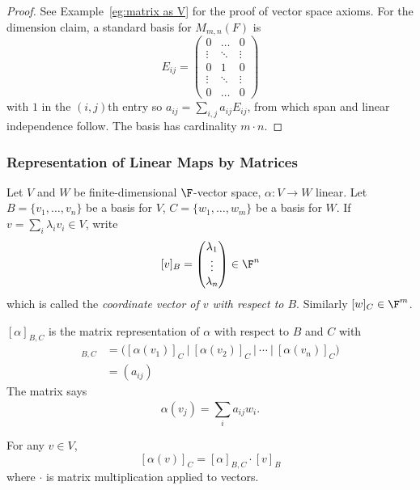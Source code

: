 \documentclass[a4paper]{article}
\theoremstyle{definition}
\begin{document}
\begin{proof}
  See Example~\ref{eg:matrix as V} for the proof of vector space axioms. For the dimension claim, a standard basis for \(M_{m,n}(F)\) is
  \[
    E_{ij}=
    \begin{pmatrix}
      0 & \dots & 0 \\
      \vdots & \ddots & \vdots \\
      0 & 1 & 0 \\
      \vdots & \ddots & \vdots \\
      0 & \dots & 0 
    \end{pmatrix}
  \]
  with \(1\) in the \((i,j)\)th entry so \(a_{ij} = \sum_{i,j}^{} a_{ij}E_{ij}\), from which span and linear independence follow. The basis has cardinality \(m\cdot n\).
\end{proof}

\subsubsection{Representation of Linear Maps by Matrices}

Let \(V\) and \(W\) be finite-dimensional \(\F\)-vector space, \(\alpha: V\to W\) linear. Let \(B = \{v_1,\ldots,v_n\}\) be a basis for \(V\), \(C = \{w_1,\ldots,w_m\}\) be a basis for \(W\). If \(v=\sum_{i}\lambda_iv_i \in V\), write
\[
[v]_B =
\begin{pmatrix}
  \lambda_1 \\
  \vdots \\
  \lambda_n
\end{pmatrix}
\in \F^n
\]
which is called the \emph{coordinate vector of \(v\) with respect to \(B\)}. Similarly \([w]_C\in \F^m\).

\begin{defi}
  \([\alpha]_{B,C}\) is the matrix representation of \(\alpha\) with respect to \(B\) and \(C\) with
  \begin{align*}
    [\alpha]_{B,C} &= \Big( [\alpha(v_1)]_C \: \Big| \: [\alpha(v_2)]_C \: \Big | \: \cdots \: \Big| \: [\alpha(v_n)]_C \big) \\
    &= (a_{ij})
  \end{align*}
  The matrix says
  \[
\alpha(v_j) = \sum_{i}^{ }a_{ij}w_i.
  \]
\end{defi}

\begin{lem}
  For any \(v\in V\),
  \[
[\alpha(v)]_C = [\alpha]_{B,C}\cdot [v]_B
  \]
  where \(\cdot\) is matrix multiplication applied to vectors.
\end{lem}
\end{document}
